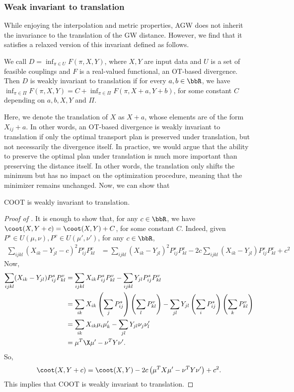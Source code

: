 \subsubsection{Weak invariant to translation}
While enjoying the interpolation and metric properties, AGW does not inherit the invariance
to the translation of the GW distance. However, we find that it satisfies a relaxed version
of this invariant defined as follows.
\begin{definition}
    We call $D = \inf_{\pi \in U} F(\pi, X, Y)$, where $X, Y$ are input data and $U$
    is a set of feasible couplings and $F$ is a real-valued functional, an OT-based divergence.
    Then $D$ is weakly invariant to translation if for every $a, b \in \bbR$, we have
    $\inf_{\pi \in \Pi} F(\pi, X, Y) = C + \inf_{\pi \in \Pi} F(\pi, X + a, Y+b)$,
    for some constant $C$ depending on $a, b, X, Y$ and $\Pi$.
\end{definition}
Here, we denote the translation of $X$ as $X + a$, whose elements are of the form $X_{ij} + a$.
In other words, an OT-based divergence is weakly invariant to translation if only
the optimal transport plan is preserved under translation, but not necessarily the divergence itself.
In practice, we would argue that the ability to preserve the optimal plan under translation
is much more important than preserving the distance itself. In other words,
the translation only shifts the minimum but has no impact on the optimization procedure,
meaning that the minimizer remains unchanged. Now, we can show that
\begin{corollary}
\label{prop:coot_invariant}
    COOT is weakly invariant to translation.
\end{corollary}
\begin{proof}[Proof of ]
It is enough to show that, for any $c \in \bbR$, we have $\coot(X, Y + c) = \coot(X, Y) + C$,
for some constant $C$. Indeed, given $P^s \in U(\mu, \nu), P^v \in U(\mu', \nu')$,
for any $c \in \bbR$,
\begin{align}
    \sum_{ijkl} (X_{ik} - Y_{jl} - c)^2 P^s_{ij} P^v_{kl}
    &= \sum_{ijkl} (X_{ik} - Y_{jl})^2 P^s_{ij} P^v_{kl}
    - 2c \sum_{ijkl} (X_{ik} - Y_{jl}) P^s_{ij} P^v_{kl} + c^2
\end{align}
Now,
\begin{align}
    \sum_{ijkl} (X_{ik} - Y_{jl}) P^s_{ij} P^v_{kl}
    &= \sum_{ijkl} X_{ik} P^s_{ij} P^v_{kl} - \sum_{ijkl} Y_{jl} P^s_{ij} P^v_{kl} \\
    &= \sum_{ik} X_{ik} \left( \sum_j P^s_{ij} \right) \left( \sum_l P^v_{kl} \right)
    - \sum_{jl} Y_{jl} \left( \sum_i P^s_{ij} \right) \left( \sum_k P^v_{kl} \right) \\
    &= \sum_{ik} X_{ik} \mu_i \mu'_k - \sum_{jl} Y_{jl} \nu_j \nu'_l \\
    &= \mu ^T \X \mu' - \nu ^T Y \nu'.
\end{align}
So,
\begin{align}
    \coot(X, Y + c) = \coot(X, Y) - 2 c \left( \mu^T X \mu' - \nu^T Y \nu' \right) + c^2.
\end{align}
This implies that COOT is weakly invariant to translation.
\end{proof}

